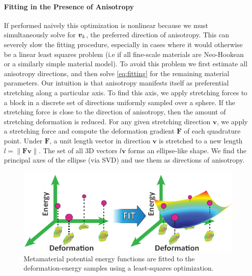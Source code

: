\paragraph{Fitting in the Presence of Anisotropy}
If performed naively this optimization is nonlinear because we must simultaneously solve for $\mbox{$\bm{v}$}_k$, the preferred direction of anisotropy. This can severely slow the fitting procedure, especially in cases where it would otherwise be a linear least squares problem (i.e if all fine-scale materials are Neo-Hookean or a similarly simple material model).
To avoid this problem we first estimate all anisotropy directions, and then solve \autoref{eq:fitting} for the remaining material parameters.
Our intuition is that anisotropy manifests itself as preferential stretching along a particular axis. To find this axis, we apply stretching forces to a block in a discrete set of directions uniformly sampled over a sphere.
If the stretching force is close to the direction of anisotropy, then the amount of stretching deformation is reduced.
For any given stretching direction $\mathbf{v}$, we apply a stretching force and compute the deformation gradient $\mathbf{F}$ of  each quadrature point.
Under $\mathbf{F}$, a unit length vector in direction $\mathbf{v}$ is stretched to a new length $l = \|\mathbf{F}\mathbf{v}\|$.
The set of all 3D vectors $l\mathbf{v}$ forms an ellipse-like shape.
We find the principal axes of the ellipse (via SVD) and use them as directions of anisotropy.
\begin{figure}
	\centering
	\includegraphics[width=0.8\columnwidth]{images/fitting.pdf}
	\caption{ Metamaterial potential energy functions are fitted to the deformation-energy samples using a least-squares optimization.}
	\label{fig:fitting}
\end{figure}
